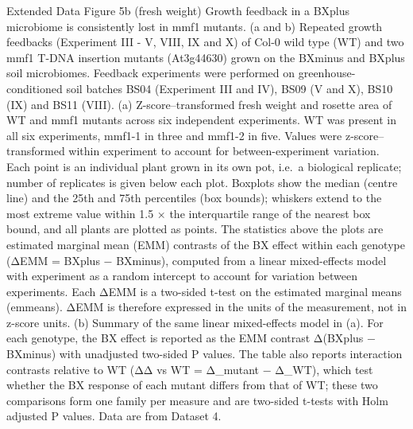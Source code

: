 \documentclass[
  10pt,
]{article}
\begin{document}
Extended Data Figure 5b (fresh weight) \textbar{} Growth feedback in a
BXplus microbiome is consistently lost in mmf1 mutants. (a and b)
Repeated growth feedbacks (Experiment III - V, VIII, IX and X) of Col-0
wild type (WT) and two mmf1 T-DNA insertion mutants (At3g44630) grown on
the BXminus and BXplus soil microbiomes. Feedback experiments were
performed on greenhouse-conditioned soil batches BS04 (Experiment III
and IV), BS09 (V and X), BS10 (IX) and BS11 (VIII). (a)
Z-score--transformed fresh weight and rosette area of WT and mmf1
mutants across six independent experiments. WT was present in all six
experiments, mmf1-1 in three and mmf1-2 in five. Values were
z-score--transformed within experiment to account for between-experiment
variation. Each point is an individual plant grown in its own pot,
i.e.~a biological replicate; number of replicates is given below each
plot. Boxplots show the median (centre line) and the 25th and 75th
percentiles (box bounds); whiskers extend to the most extreme value
within 1.5 × the interquartile range of the nearest box bound, and all
plants are plotted as points. The statistics above the plots are
estimated marginal mean (EMM) contrasts of the BX effect within each
genotype (ΔEMM = BXplus − BXminus), computed from a linear mixed-effects
model with experiment as a random intercept to account for variation
between experiments. Each ΔEMM is a two-sided t-test on the estimated
marginal means (emmeans). ΔEMM is therefore expressed in the units of
the measurement, not in z-score units. (b) Summary of the same linear
mixed-effects model in (a). For each genotype, the BX effect is reported
as the EMM contrast Δ(BXplus − BXminus) with unadjusted two-sided P
values. The table also reports interaction contrasts relative to WT (ΔΔ
vs WT = Δ\_mutant − Δ\_WT), which test whether the BX response of each
mutant differs from that of WT; these two comparisons form one family
per measure and are two-sided t-tests with Holm adjusted P values. Data
are from Dataset 4.
\end{document}
